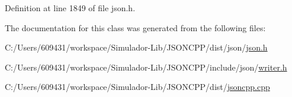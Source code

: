 Definition at line 1849 of file json.\+h.



The documentation for this class was generated from the following files\+:\begin{DoxyCompactItemize}
\item 
C\+:/\+Users/609431/workspace/\+Simulador-\/\+Lib/\+J\+S\+O\+N\+C\+P\+P/dist/json/\hyperlink{dist_2json_2json_8h}{json.\+h}\item 
C\+:/\+Users/609431/workspace/\+Simulador-\/\+Lib/\+J\+S\+O\+N\+C\+P\+P/include/json/\hyperlink{writer_8h}{writer.\+h}\item 
C\+:/\+Users/609431/workspace/\+Simulador-\/\+Lib/\+J\+S\+O\+N\+C\+P\+P/dist/\hyperlink{jsoncpp_8cpp}{jsoncpp.\+cpp}\end{DoxyCompactItemize}

